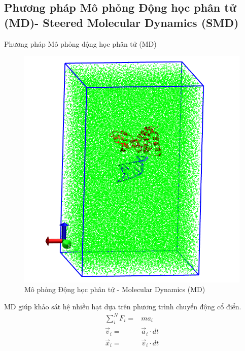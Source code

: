 \documentclass[10pt]{beamer}
\begin{document}
\subsection{Phương pháp Mô phỏng Động học phân tử (MD)- Steered Molecular Dynamics (SMD)}
	\begin{frame}{Phương pháp Mô phỏng động học phân tử (MD)}
		\begin{figure}
		\centering
		\includegraphics[width=0.7\linewidth,natwidth=610,natheight=642]{MD}
		\caption{Mô phỏng Động học phân tử - Molecular Dynamics (MD)}
		\label{fig:md}
		\end{figure}
		MD giúp khảo sát hệ nhiều hạt dựa trên phương trình chuyển động cổ điển.
		\begin{eqnarray}
		\label{force}
		\sum_{i}^{N} F_{i} = & m a_{i} \\
		\label{velocity}
		\vec{v}_{i} = & \vec{a}_{i}\cdot dt \\
		\vec{x}_{i} = & \vec{v}_{i}\cdot dt
		\label{coordinate}
		\end{eqnarray}

	
		
	\end{frame}
	
\end{document}
